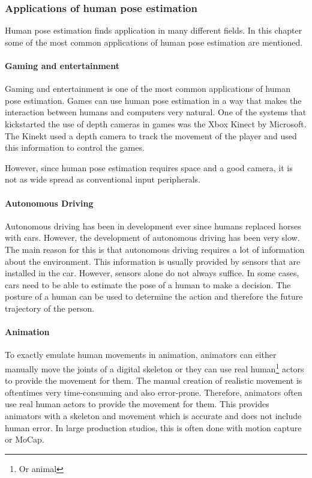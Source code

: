 \subsubsection{Applications of human pose estimation}
Human pose estimation finds application in many different fields. In this chapter some of the most common applications of human pose estimation are mentioned.

\paragraph{Gaming and entertainment}

Gaming and entertainment is one of the most common applications of human pose estimation. Games can use human pose estimation in a way that makes the interaction between humans and computers very natural. One of the systems that kickstarted the use of depth cameras in games was the Xbox Kinect by Microsoft. The Kinekt used a depth camera to track the movement of the player and used this information to control the games. \cite[Citation needed]{}

However, since human pose estimation requires space and a good camera, it is not as wide spread as conventional input peripherals.

\paragraph{Autonomous Driving}

Autonomous driving has been in development ever since humans replaced horses with cars\cite{OldAutoDrive}. However, the development of autonomous driving has been very slow. The main reason for this is that autonomous driving requires a lot of information about the environment. This information is usually provided by sensors that are installed in the car. However, sensors alone do not always suffice. In some cases, cars need to be able to estimate the pose of a human to make a decision. The posture of a human can be used to determine the action and therefore the future trajectory of the person. 

\paragraph{Animation}

To exactly emulate human movements in animation, animators can either manually move the joints of a digital skeleton or they can use real human\footnote{Or animal} actors to provide the movement for them. The manual creation of realistic movement is oftentimes very time-consuming and also error-prone. Therefore, animators often use real human actors to provide the movement for them. This provides animators with a skeleton and movement which is accurate and does not include human error. In large production studios, this is often done with motion capture or MoCap. 

